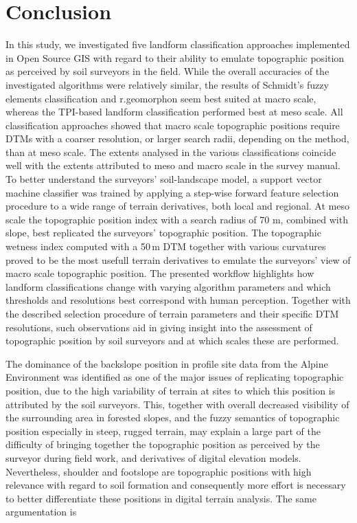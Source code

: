 \documentclass[preprint,12pt,authoryear]{elsarticle}
\begin{document}
\section{Conclusion}
In this study, we investigated five landform classification approaches implemented in Open Source GIS with regard to their ability to emulate topographic position as perceived by soil surveyors in the field. While the overall accuracies of the investigated algorithms were relatively similar, the results of Schmidt's fuzzy elements classification and r.geomorphon seem best suited at macro scale, whereas the TPI-based landform classification performed best at meso scale. All classification approaches showed that macro scale topographic positions require DTMs with a coarser resolution, or larger search radii, depending on the method, than at meso scale. The extents analysed in the various classifications coincide well with the extents attributed to meso and macro scale in the survey manual. To better understand the surveyors' soil-landscape model, a support  vector machine classifier was trained by applying a step-wise forward feature selection procedure to a wide range of terrain derivatives, both local and regional. At meso scale the topographic position index with a search radius of 70 m, combined with slope, best replicated the surveyors' topographic position. The topographic wetness index computed with a 50\,m DTM together with various curvatures proved to be the most usefull terrain derivatives to emulate the surveyors' view of macro scale topographic position. The presented workflow highlights how landform classifications change with varying algorithm parameters and which thresholds and resolutions best correspond with human perception. Together with the described selection procedure of terrain parameters and their specific DTM resolutions, such observations aid in giving insight into the assessment of topographic position by soil surveyors and at which scales these are performed.
  
The dominance of the backslope position in profile site data from the Alpine Environment was identified as one of the major issues of replicating topographic position, due to the high variability of terrain at sites to which this position is attributed by the soil surveyors. This, together with overall decreased visibility of the surrounding area in forested slopes, and the fuzzy semantics of topographic position especially in steep, rugged terrain, may explain a large part of the difficulty of bringing together the topographic position as perceived by the surveyor during field work, and derivatives of digital elevation models. Nevertheless, shoulder and footslope are topographic positions with high relevance with regard to soil formation and consequently more effort is necessary to better differentiate these positions in digital terrain analysis. The same argumentation is  
\end{document}
